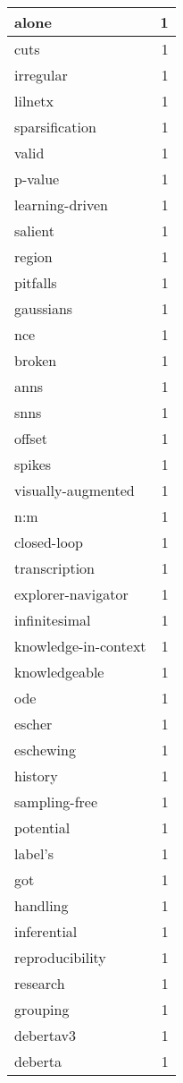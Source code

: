 \begin{table}[h]
\begin{tabular}{|l|r|}
\hline
alone & 1 \\
\hline
cuts & 1 \\
\hline
irregular & 1 \\
\hline
lilnetx & 1 \\
\hline
sparsification & 1 \\
\hline
valid & 1 \\
\hline
p-value & 1 \\
\hline
learning-driven & 1 \\
\hline
salient & 1 \\
\hline
region & 1 \\
\hline
pitfalls & 1 \\
\hline
gaussians & 1 \\
\hline
nce & 1 \\
\hline
broken & 1 \\
\hline
anns & 1 \\
\hline
snns & 1 \\
\hline
offset & 1 \\
\hline
spikes & 1 \\
\hline
visually-augmented & 1 \\
\hline
n:m & 1 \\
\hline
closed-loop & 1 \\
\hline
transcription & 1 \\
\hline
explorer-navigator & 1 \\
\hline
infinitesimal & 1 \\
\hline
knowledge-in-context & 1 \\
\hline
knowledgeable & 1 \\
\hline
ode & 1 \\
\hline
escher & 1 \\
\hline
eschewing & 1 \\
\hline
history & 1 \\
\hline
sampling-free & 1 \\
\hline
potential & 1 \\
\hline
label's & 1 \\
\hline
got & 1 \\
\hline
handling & 1 \\
\hline
inferential & 1 \\
\hline
reproducibility & 1 \\
\hline
research & 1 \\
\hline
grouping & 1 \\
\hline
debertav3 & 1 \\
\hline
deberta & 1 \\

\end{tabular}
\end{table}
